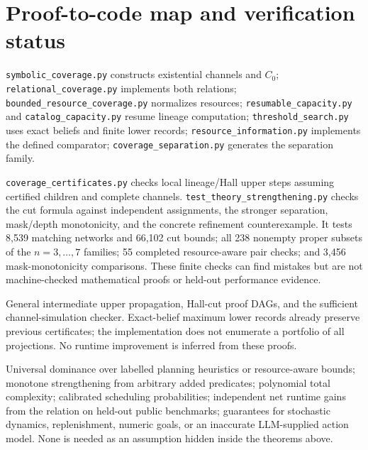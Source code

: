 \documentclass[11pt]{article}
\theoremstyle{definition}
\begin{document}
\section{Proof-to-code map and verification status}
\begin{description}[style=nextline]
\item[Implemented before this supplement.]
\texttt{symbolic\_coverage.py} constructs existential channels and $C_0$;
\texttt{relational\_coverage.py} implements both relations;
\texttt{bounded\_resource\_coverage.py} normalizes resources;
\texttt{resumable\_capacity.py} and \texttt{catalog\_capacity.py} resume lineage
computation; \texttt{threshold\_search.py} uses exact beliefs and finite lower
records; \texttt{resource\_information.py} implements the defined comparator;
\texttt{coverage\_separation.py} generates the separation family.
\item[New reference checks, not a production algorithm change.]
\texttt{coverage\_certificates.py} checks local lineage/Hall upper steps assuming
certified children and complete channels. \texttt{test\_theory\_strengthening.py}
checks the cut formula against independent assignments, the stronger separation,
mask/depth monotonicity, and the concrete refinement counterexample. It tests
8,539 matching networks and 66,102 cut bounds; all 238 nonempty proper subsets
of the $n=3,\ldots,7$ families; 55 completed resource-aware pair checks; and
3,456 mask-monotonicity comparisons. These finite checks can find mistakes but
are not machine-checked mathematical proofs or held-out performance evidence.
\item[Proved here but not integrated as a new production mechanism.]
General intermediate upper propagation, Hall-cut proof DAGs, and the sufficient
channel-simulation checker. Exact-belief maximum lower records already preserve
previous certificates; the implementation does not enumerate a portfolio of
all projections. No runtime improvement is inferred from these proofs.
\item[Still unproved or unsupported.]
Universal dominance over labelled planning heuristics or resource-aware bounds;
monotone strengthening from arbitrary added predicates; polynomial total
complexity; calibrated scheduling probabilities; independent net runtime gains
from the relation on held-out public benchmarks; guarantees for stochastic
dynamics, replenishment, numeric goals,
or an inaccurate LLM-supplied action model. None is needed as an assumption
hidden inside the theorems above.
\end{description}
\end{document}
